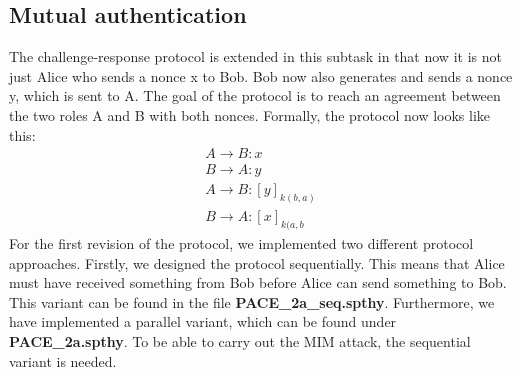 \documentclass[a4paper,11pt]{scrartcl}
\begin{document}
\subsection{Mutual authentication}
The challenge-response protocol is extended in this subtask in that now it is not just Alice who sends a nonce x to Bob.  Bob now also generates and sends a nonce y,  which is sent to A. The goal of the protocol is to reach an agreement between the two roles A and B with both nonces. Formally, the protocol now looks like this:
\begin{align*}
A \rightarrow B: x\\
B \rightarrow A: y\\
A \rightarrow B: [y]_{k(b,a)}\\
B \rightarrow A: [x]_{k(a,b}
\end{align*}
For the first revision of the protocol, we implemented two different protocol approaches. Firstly, we designed the protocol sequentially. This means that Alice must have received something from Bob before Alice can send something to Bob. This variant can be found in the file \textbf{PACE_2a_seq.spthy}. Furthermore, we have implemented a parallel variant, which can be found under \textbf{PACE_2a.spthy}. To be able to carry out the MIM attack, the sequential variant is needed.
\end{document}
